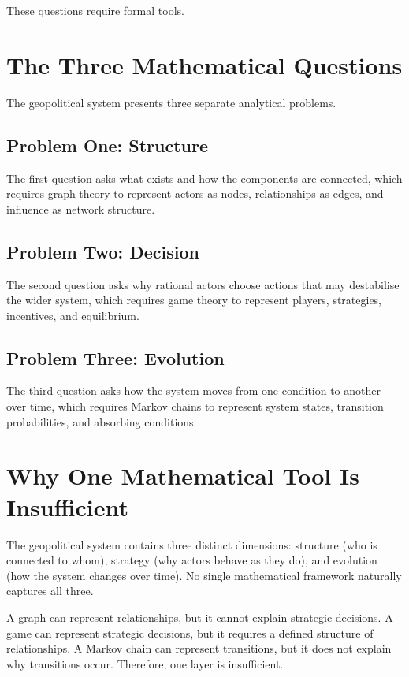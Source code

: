 \documentclass[11pt,openany]{book}
\theoremstyle{plain}
\theoremstyle{definition}
\begin{document}
These questions require formal tools.

\section*{The Three Mathematical Questions}

The geopolitical system presents three separate analytical problems.

\subsection*{Problem One: Structure}

The first question asks what exists and how the components are connected, which requires graph theory to represent actors as nodes, relationships as edges, and influence as network structure.

\subsection*{Problem Two: Decision}

The second question asks why rational actors choose actions that may destabilise the wider system, which requires game theory to represent players, strategies, incentives, and equilibrium.

\subsection*{Problem Three: Evolution}

The third question asks how the system moves from one condition to another over time, which requires Markov chains to represent system states, transition probabilities, and absorbing conditions.

\section*{Why One Mathematical Tool Is Insufficient}

The geopolitical system contains three distinct dimensions: structure (who is connected to whom), strategy (why actors behave as they do), and evolution (how the system changes over time). No single mathematical framework naturally captures all three.

A graph can represent relationships, but it cannot explain strategic decisions. A game can represent strategic decisions, but it requires a defined structure of relationships. A Markov chain can represent transitions, but it does not explain why transitions occur. Therefore, one layer is insufficient.
\end{document}
